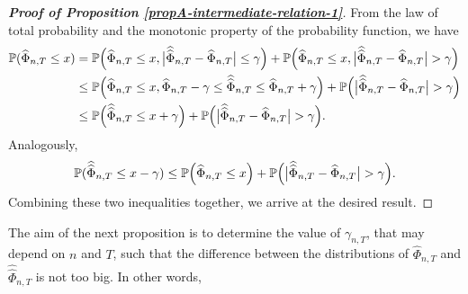 \documentclass[a4paper,12pt]{article}
\newcommand{\doublehattwo}[1]{\widehat{\widehat{#1}}}
\begin{document}
\begin{proof}[\textnormal{\textbf{Proof of Proposition \ref{propA-intermediate-relation-1}}}] 
From the law of total probability and the monotonic property of the probability function, we have
\begin{align*} \pr(\widehat{\Phi}_{n, T} \le x) &= \pr \Big(\widehat{\Phi}_{n, T} \le x, \big|\doublehattwo{\Phi}_{n,T} - \widehat{\Phi}_{n,T}\big| \le \gamma \Big) + \pr \Big(\widehat{\Phi}_{n, T} \le x, \big|\doublehattwo{\Phi}_{n,T} - \widehat{\Phi}_{n,T}\big| > \gamma \Big) \\
& \le  \pr \Big(\widehat{\Phi}_{n, T} \le x, \widehat{\Phi}_{n,T} - \gamma \le \doublehattwo{\Phi}_{n,T} \le \widehat{\Phi}_{n,T} + \gamma \Big) + \pr \Big(\big|\doublehattwo{\Phi}_{n,T} - \widehat{\Phi}_{n,T}\big| > \gamma \Big) \\
& \le  \pr \Big(\doublehattwo{\Phi}_{n,T} \le x + \gamma \Big) + \pr \Big(\big|\doublehattwo{\Phi}_{n,T} - \widehat{\Phi}_{n,T}\big| > \gamma \Big).
\end{align*}
Analogously, 
\begin{align*} \pr(\doublehattwo{\Phi}_{n, T} \le x - \gamma)  \le  \pr \Big(\widehat{\Phi}_{n,T} \le x \Big) + \pr \Big(\big|\doublehattwo{\Phi}_{n,T} - \widehat{\Phi}_{n,T}\big| > \gamma \Big).
\end{align*}
Combining these two inequalities together, we arrive at the desired result.
\end{proof}

The aim of the next proposition is to determine the value of $\gamma_{n, T}$, that may depend on $n$ and $T$, such that the difference between the distributions of $\widehat{\Phi}_{n, T}$ and $\doublehattwo{\Phi}_{n, T}$ is not too big. In other words,
\end{document}
